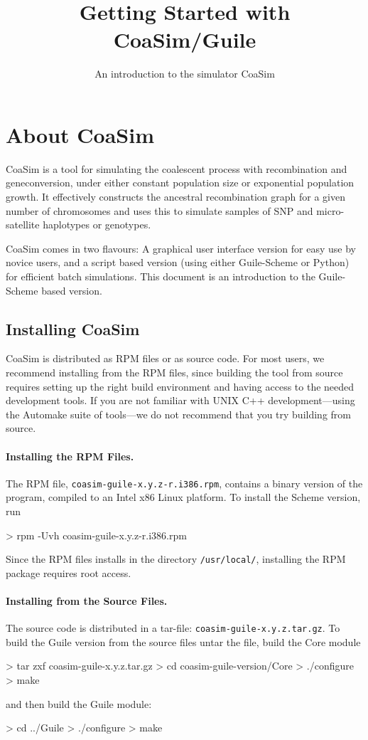 \documentclass{manual}
\title{Getting Started with CoaSim/Guile}
\subtitle{An introduction to the simulator CoaSim}
\begin{document}
\section{About CoaSim}

CoaSim is a tool for simulating the coalescent process with
recombination and geneconversion, under either constant population
size or exponential population growth.  It effectively constructs the
ancestral recombination graph for a given number of chromosomes and
uses this to simulate samples of SNP and micro-satellite haplotypes or
genotypes.

CoaSim comes in two flavours: A graphical user interface version for
easy use by novice users, and a script based version (using either
Guile-Scheme or Python) for efficient batch simulations.  This
document is an introduction to the Guile-Scheme based version.

\subsection{Installing CoaSim}

CoaSim is distributed as RPM files or as source code.  For most users,
we recommend installing from the RPM files, since building the tool
from source requires setting up the right build environment and having
access to the needed development tools.  If you are not familiar with
UNIX C++ development---using the Automake suite of tools---we do not
recommend that you try building from source.

\paragraph{Installing the RPM Files.}

The RPM file, \verb?coasim-guile-x.y.z-r.i386.rpm?, contains a binary
version of the program, compiled to an Intel x86 Linux platform.  To
install the Scheme version, run
\begin{code}
> rpm -Uvh coasim-guile-x.y.z-r.i386.rpm
\end{code}
Since the RPM files installs in the directory \verb?/usr/local/?,
installing the RPM package requires root access.

\paragraph{Installing from the Source Files.}

The source code is distributed in a tar-file:
\verb?coasim-guile-x.y.z.tar.gz?.  To build the Guile version from
the source files untar the file, build the Core module
\begin{code}
> tar zxf coasim-guile-x.y.z.tar.gz
> cd coasim-guile-version/Core
> ./configure
> make
\end{code}
and then build the Guile module:
\begin{code}
> cd ../Guile
> ./configure
> make
\end{code}
\end{document}
